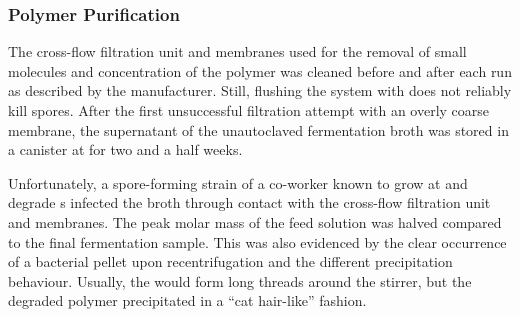 \subsubsection{Polymer Purification}
The cross-flow filtration unit and membranes used for the removal of small molecules and concentration of the polymer was cleaned before and after each run as described by the manufacturer. Still, flushing the system with  does not reliably kill spores. After the first unsuccessful filtration attempt with an overly coarse membrane, the supernatant of the unautoclaved fermentation broth was stored in a canister at  for two and a half weeks.

Unfortunately, a spore-forming strain of a co-worker known to grow at  and degrade \eps{}s infected the broth through contact with the cross-flow filtration unit and membranes. The peak molar mass of the feed solution was halved compared to the final fermentation sample. This was also evidenced by the clear occurrence of a bacterial pellet upon recentrifugation and the different precipitation behaviour. Usually, the \eps{} would form long threads around the stirrer, but the degraded polymer precipitated in a \enquote{cat hair-like} fashion.


